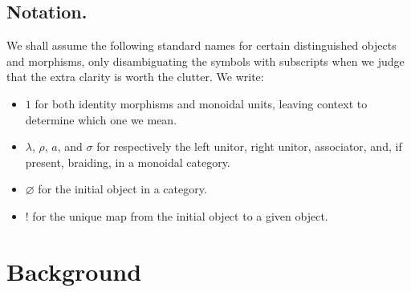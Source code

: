\subsection{Notation.}
We shall assume the following standard names for certain distinguished objects
and morphisms, only disambiguating the symbols with subscripts when we judge
that the extra clarity is worth the clutter. We write: 
\begin{itemize} 
  \item $1$ for both identity morphisms and monoidal units, leaving context to
    determine which one we mean.
  \item $\lambda$, $\rho$, $a$, and $\sigma$ for respectively the left unitor, right unitor,
    associator, and, if present, braiding, in a monoidal category.
  \item $\varnothing$ for the initial object in a category.
  \item $!$ for the unique map from the initial object to a given object.
\end{itemize}

\section{Background}
